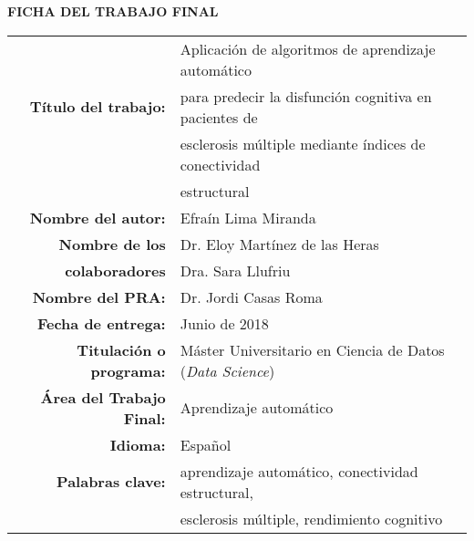 \begin{center}

\textbf{FICHA DEL TRABAJO FINAL}

\begin{table}[H]
\centering
\label{my-label}
\begin{tabular}{|r|l|}
\hline
\multirow{3}{*}{\textbf{Título del trabajo:}}          & Aplicación de algoritmos de aprendizaje automático   \\
                                                       & para predecir la disfunción cognitiva en pacientes de   \\ 
                                                       & esclerosis múltiple mediante índices de conectividad \\
                                                       & estructural \\            
\hline
\textbf{Nombre del autor:}                             & Efraín Lima Miranda                                \\
\hline
\textbf{Nombre de los} & Dr. Eloy Martínez de las Heras                   \\ 
\textbf{colaboradores}  & Dra. Sara Llufriu                                 \\
                                                       \hline
\textbf{Nombre del PRA:}                               & Dr. Jordi Casas Roma                               \\ 
\hline
\textbf{Fecha de entrega:}                              & Junio de 2018 \\ 
\hline

\textbf{Titulación o programa:}                        & Máster Universitario en Ciencia de Datos (\textit{Data Science}) \\
\hline
\textbf{Área del Trabajo Final:}                       & Aprendizaje automático                                 \\ 
\hline
\textbf{Idioma:}                       & Español                                 \\ 

\hline
\textbf{Palabras clave:}                               & aprendizaje automático, conectividad estructural, \\
                                                       & esclerosis múltiple, rendimiento cognitivo \\ 
\hline

\end{tabular}
\end{table}

\null\vfill

\end{center}
\newpage
